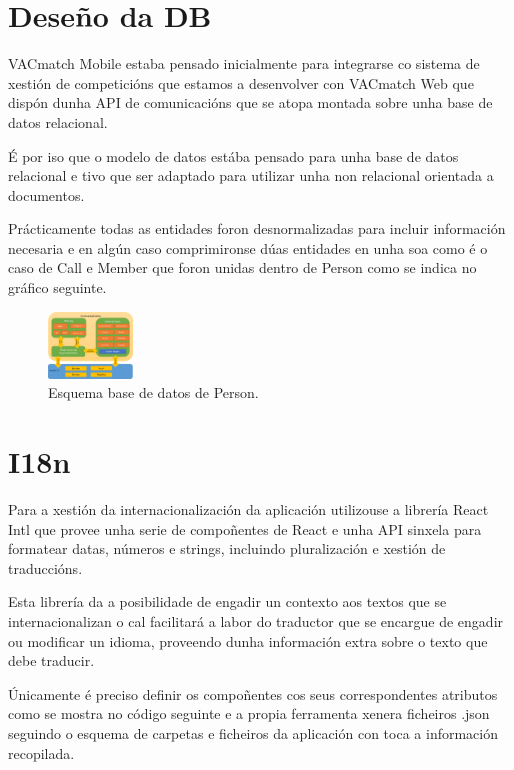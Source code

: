   \section{Deseño da DB}
  VACmatch Mobile estaba pensado inicialmente para integrarse co sistema de 
xestión de competicións que estamos a desenvolver con VACmatch Web que dispón 
dunha API de comunicacións que se atopa montada sobre unha base de datos 
relacional.

  É por iso que o modelo de datos estába pensado para unha base de 
datos relacional e tivo que ser adaptado para utilizar unha non relacional 
orientada a documentos.

  Prácticamente todas as entidades foron desnormalizadas para incluir 
información necesaria e en algún caso comprimironse dúas entidades en unha soa 
como é o caso de Call e Member que foron unidas dentro de Person como se indica 
no gráfico seguinte.

    \begin{figure}[h!]
      \begin{center}
      \includegraphics[width=0.2\textwidth]{./img/cordova_arquitectura.png}
      \caption{Esquema base de datos de Person.}
      \end{center}
    \end{figure}

  \section{I18n}
  Para a xestión da internacionalización da aplicación utilizouse a librería 
React Intl que provee unha serie de compoñentes de React e unha API sinxela 
para formatear datas, números e strings, incluindo pluralización e xestión de 
traduccións.

  Esta librería da a posibilidade de engadir un contexto aos textos que se 
internacionalizan o cal facilitará a labor do traductor que se encargue de 
engadir ou modificar un idioma, proveendo dunha información extra sobre o texto 
que debe traducir.

  Únicamente é preciso definir os compoñentes cos seus correspondentes 
atributos como se mostra no código seguinte e a propia ferramenta xenera 
ficheiros .json seguindo o esquema de carpetas e ficheiros da aplicación con 
toca a información recopilada.


